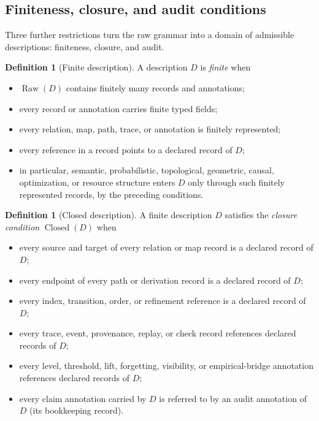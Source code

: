 \documentclass[11pt]{article}
\theoremstyle{definition}
\newtheorem{definition}[theorem]{Definition}
\newcommand{\Raw}[1]{\ensuremath{\operatorname{Raw}\!\left(#1\right)}}
\newcommand{\Closed}[1]{\ensuremath{\operatorname{Closed}\!\left(#1\right)}}
\begin{document}
\subsection{Finiteness, closure, and audit conditions}\label{subsec:conditions}

Three further restrictions turn the raw grammar into a domain of
admissible descriptions: finiteness, closure, and audit.

\begin{definition}[Finite description]\label{def:finite}
A description \(D\) is \emph{finite} when
\begin{itemize}[topsep=2pt,itemsep=1pt]
  \item \(\Raw{D}\) contains finitely many records and annotations;
  \item every record or annotation carries finite typed fields;
  \item every relation, map, path, trace, or annotation is finitely
    represented;
  \item every reference in a record points to a declared record of
    \(D\);
  \item in particular, semantic, probabilistic, topological, geometric,
    causal, optimization, or resource structure enters \(D\) only through
    such finitely represented records, by the preceding conditions.
\end{itemize}
\end{definition}

\begin{definition}[Closed description]\label{def:closed}
A finite description \(D\) satisfies the \emph{closure condition} \(\Closed{D}\)
when
\begin{itemize}[topsep=2pt,itemsep=1pt]
  \item every source and target of every relation or map record is a declared
    record of \(D\);
  \item every endpoint of every path or derivation record is a declared record
    of \(D\);
  \item every index, transition, order, or refinement reference is a declared
    record of \(D\);
  \item every trace, event, provenance, replay, or check record references
    declared records of \(D\);
  \item every level, threshold, lift, forgetting, visibility, or
    empirical-bridge annotation references declared records of \(D\);
  \item every claim annotation carried by \(D\) is referred to by an audit annotation
    of \(D\) (its bookkeeping record).
\end{itemize}
\end{definition}
\end{document}
